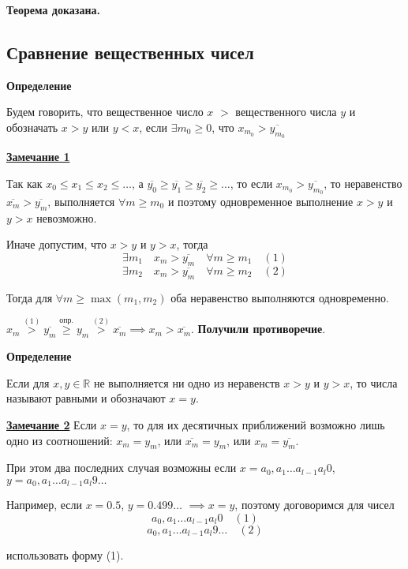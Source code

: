 \documentclass{article}
\newcommand{\parspace}{\vspace{10pt}}
\begin{document}
\textbf{Теорема доказана.}

\subsection{Сравнение вещественных чисел}
\textbf{Определение}

Будем говорить, что вещественное число $x$ $>$ вещественного числа $y$ и обозначать
$x > y$ или $y < x$, если $\exists m_0 \ge 0$, что $x_{m_0} > \overline{y_{m_0}}$

\parspace

\underline{\textbf{Замечание 1}}

Так как $x_0 \le x_1 \le x_2 \le \dots$, 
а $\overline{y_0} \ge \overline{y_1} \ge \overline{y_2} \ge \dots$,
то если $x_{m_0} > \overline{y_{m_0}}$, то неравенство $\overline{x_m} > \overline{y_m}$,
выполняется $\forall m \ge m_0$ и поэтому одновременное выполнение
$x > y$ и $y > x$ невозможно.

Иначе допустим, что $x > y$ и $y > x$, тогда
\[\exists m_1 \quad x_m > \overline{y_m} \quad \forall m \ge m_1 \quad (1)\]
\[\exists m_2 \quad x_m > \overline{y_m} \quad \forall m \ge m_2 \quad (2)\]

Тогда для $\forall m \ge \max (m_1, m_2)$ оба неравенство выполняются одновременно.

$x_m \stackrel{(1)}{>} \overline{y_m}
\stackrel{\text{опр.}}{\ge} y_m 
\stackrel{(2)}{>} \overline{x_m} \implies x_m > \overline{x_m}$.
\textbf{Получили противоречие}.

\parspace

\textbf{Определение}

Если для $x, y \in \mathbb{R}$ не выполняется ни одно из неравенств $x > y$ и $y > x$,
то числа называют равными и обозначают $x = y$.

\parspace

\underline{\textbf{Замечание 2}}
Если $x = y$, то для их десятичных приближений возможно лишь одно из соотношений:
$x_m = y_m$, или $\overline{x_m} = y_m$, или $x_m = \overline{y_m}$.

При этом два последних случая возможны если $x = a_0,a_1 \dots a_{l-1}a_l0$,
$y = a_0,a_1 \dots a_{l-1}a_l9 \dots$ 

Например, если $x = 0.5$, $y = 0.499 \dots$ $\implies x = y$,
поэтому договоримся для чисел
\[a_0,a_1 \dots a_{l-1}a_l0 \quad (1)\]
\[a_0,a_1 \dots a_{l-1}a_l9 \dots \quad (2)\]

использовать форму (1).

\parspace
\end{document}
